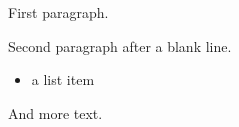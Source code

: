 \documentclass{article}\usepackage{xcolor}
\newcommand{\auditFIX}[1]{{\color{auditblue}#1}}           %
\begin{document}
\auditFIX{First paragraph.

Second paragraph after a blank line.
\begin{itemize}\item a list item\end{itemize}
And more text.}
\end{document}
